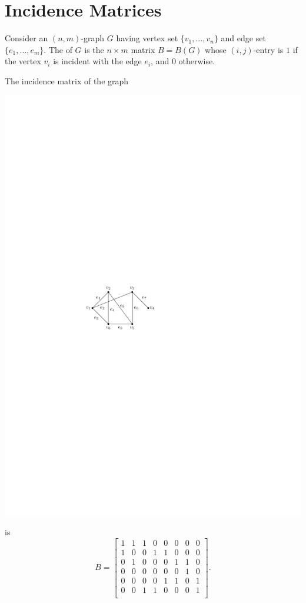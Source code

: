 \section{Incidence Matrices}\label{sec:IncMat}

Consider an $(n, m)$-graph $G$ having vertex set $\{v_1, \ldots, v_n\}$ and edge set $\{e_1, \ldots, e_m\}$. The  of $G$ is the $n \times m$ matrix $B = B(G)$ whose $(i, j)$-entry is $1$ if the vertex $v_i$ is incident with the edge $e_i$, and $0$ otherwise.

\begin{Example}\label{ex:GNM(6-8)AdjMat}
The incidence matrix of the graph
\begin{center}
\includegraphics{Images/GNM(6,8).pdf}
\end{center}
is
\begin{equation*}
B = \begin{bmatrix}
1 & 1 & 1 & 0 & 0 & 0 & 0 & 0 \\
1 & 0 & 0 & 1 & 1 & 0 & 0 & 0 \\
0 & 1 & 0 & 0 & 0 & 1 & 1 & 0 \\
0 & 0 & 0 & 0 & 0 & 0 & 1 & 0 \\
0 & 0 & 0 & 0 & 1 & 1 & 0 & 1 \\
0 & 0 & 1 & 1 & 0 & 0 & 0 & 1 \\
\end{bmatrix}.
\end{equation*}
\end{Example}

